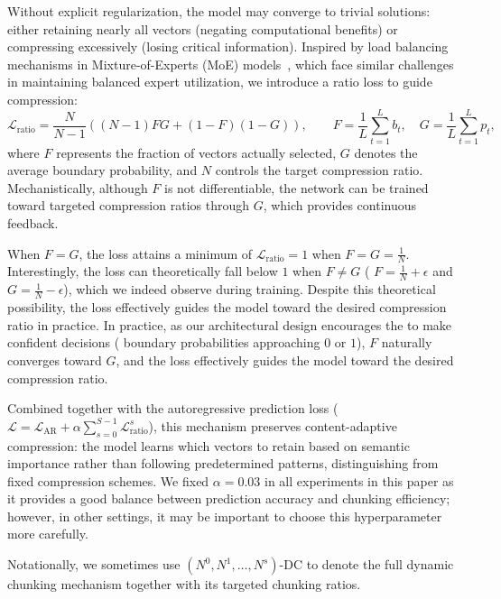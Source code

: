 Without explicit regularization, the model may converge to trivial solutions: either retaining nearly all vectors (negating computational benefits) or compressing excessively (losing critical information).
Inspired by load balancing mechanisms in Mixture-of-Experts (MoE) models~\citep{MoE}, which face similar challenges in maintaining balanced expert utilization, we introduce a ratio loss to guide compression:
\begin{equation}
    \label{eq: ratio_loss}
    \mathcal{L}_\text{ratio} = \frac{N}{N-1} \left( (N-1) FG + (1-F) (1-G) \right), \qquad F = \frac{1}{L}\sum_{t=1}^{L} b_t, \quad G = \frac{1}{L}\sum_{t=1}^{L} p_t,
\end{equation}
where $F$ represents the fraction of vectors actually selected, $G$ denotes the average boundary probability, and $N$ controls the target compression ratio.
Mechanistically, although $F$ is not differentiable, the network can be trained toward targeted compression ratios through $G$, which provides continuous feedback.

When $F = G$, the loss attains a minimum of $\mathcal{L}_\text{ratio}=1$ when $F = G = \frac{1}{N}$.
Interestingly, the loss can theoretically fall below $1$ when $F \neq G$ (\eg{} $F = \frac{1}{N} + \epsilon$ and $G = \frac{1}{N} - \epsilon$), which we indeed observe during training.
Despite this theoretical possibility, the loss effectively guides the model toward the desired compression ratio in practice.
In practice, as our architectural design encourages the \router{} to make confident decisions (\ie{} boundary probabilities approaching $0$ or $1$), $F$ naturally converges toward $G$, and the loss effectively guides the model toward the desired compression ratio.


Combined together with the autoregressive prediction loss (\ie{} $\mathcal{L} = \mathcal{L}_\text{AR} + \alpha \sum_{s=0}^{S-1} \mathcal{L}_\text{ratio}^{s}$), this mechanism preserves content-adaptive compression: the model learns which vectors to retain based on semantic importance rather than following predetermined patterns, distinguishing \model{} from fixed compression schemes.
We fixed $\alpha = 0.03$ in all experiments in this paper as it provides a good balance between prediction accuracy and chunking efficiency; however, in other settings, it may be important to choose this hyperparameter more carefully.

Notationally, we sometimes use $(N^0, N^1, \dots, N^s)$-DC to denote the full dynamic chunking mechanism together with its targeted chunking ratios.

